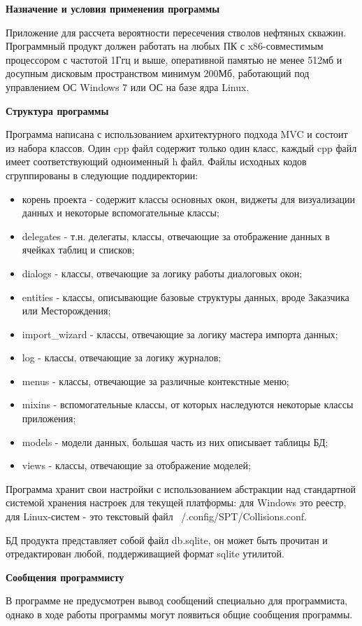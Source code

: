 \textbf{Назначение и условия применения программы}

Приложение для рассчета вероятности пересечения стволов нефтяных скважин.
Программный продукт должен работать на любых ПК с x86-совместимым процессором с частотой 1Ггц и выше,
оперативной памятью не менее 512мб и досупным дисковым пространством минимум 200Мб, работающий под
управлением ОС Windows 7 или ОС на базе ядра Linux.

\textbf{Структура программы}

Программа написана с использованием архитектурного подхода MVC и состоит из набора классов. Один cpp файл содержит только
один класс, каждый cpp файл имеет соответствующий одноименный h файл. Файлы исходных кодов сгруппированы в следующие
поддиректории:
\begin{itemize}
  \item корень проекта - содержит классы основных окон, виджеты для визуализации данных и некоторые вспомогательные классы;
  \item delegates - т.н. делегаты, классы, отвечающие за отображение данных в ячейках таблиц и списков;
  \item dialogs - классы, отвечающие за логику работы диалоговых окон;
  \item entities - классы, описывающие базовые структуры данных, вроде Заказчика или Месторождения;
  \item import\_wizard - классы, отвечающие за логику мастера импорта данных;
  \item log - классы, отвечающие за логику журналов;
  \item menus - классы, отвечающие за различные контекстные меню;
  \item mixins - вспомогательные классы, от которых наследуются некоторые классы приложения;
  \item models - модели данных, большая часть из них описывает таблицы БД;
  \item views - классы, отвечающие за отображение моделей;
\end{itemize}

Программа хранит свои настройки с использованием абстракции над стандартной системой хранения настроек для текущей платформы:
для Windows это реестр, для Linux-систем - это текстовый файл ~/.config/SPT/Collisions.conf.

БД продукта представляет собой файл db.sqlite, он может быть прочитан и отредактирован любой, поддерживащией формат sqlite утилитой.

\textbf{Сообщения программисту}

В программе не предусмотрен вывод сообщений специально для программиста, однако в ходе работы программы могут появиться
общие сообщения программы.
